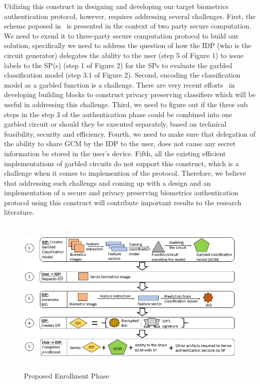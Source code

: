 \documentclass[10pt]{article}
\begin{document}
Utilizing this construct in designing and developing our target biometrics authentication protocol, however, requires addressing several challenges. 
First, the scheme poposed in~\cite{reusablegc} is presented in the context of two party secure computation. We need to exend it to three-party 
secure computation protocol to build our solution, specifically we need to address the question of how the IDP (who is the circuit generator) 
delegates the ability to the user (step 5 of Figure 1) to issue labels  to the SP(s) (step 1 of Figure 2) for the SPs to evaluate the garbled 
classification model (step 3.1 of Figure 2). 
Second, encoding the classification model as a garbled function is a challenge. There are very recent efforts~\cite{mlgc} in developing building 
blocks to construct privacy preserving classifiers which will be useful in addressing this challenge.
Third, we need to figure out if the three sub steps in the step 3 of the authentication phase could be combined into one garbled 
circuit or should they be executed separately, based on technical feasibility, security and efficiency.
Fourth, we need to make sure that delegation of the ability to share GCM by the IDP to the user, does not cause any secret information be stored in 
the user's device.
Fifth, all the existing efficient implementations of garbled circuits do not support this construct, which is a challenge when it comes 
to implemention of the protocol. 
Therefore, we believe that addressing such challengs and coming up with a design and an implementation of a secure and privacy preserving biometrics 
authentication protocol using this construct will contribute important results to the research literature. 
\begin{figure}[h]
\centering
\includegraphics[height=3.00in,width=5.00in]{enrollment}
\caption{Proposed Enrollment Phase}
\label{example}
\end{figure}
\end{document}
